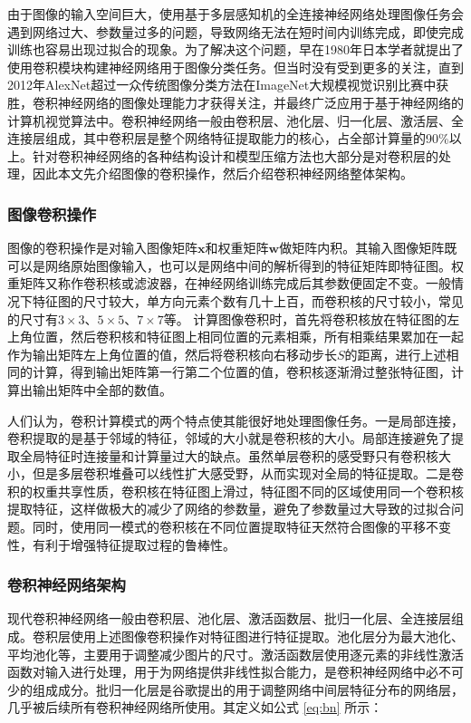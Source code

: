 由于图像的输入空间巨大，使用基于多层感知机的全连接神经网络处理图像任务会遇到网络过大、参数量过多的问题，导致网络无法在短时间内训练完成，即使完成训练也容易出现过拟合的现象。为了解决这个问题，早在1980年日本学者就提出了使用卷积模块构建神经网络用于图像分类任务\cite{fukushima1982neocognitron}。但当时没有受到更多的关注，直到2012年AlexNet\cite{alexnet}超过一众传统图像分类方法在ImageNet大规模视觉识别比赛中获胜，卷积神经网络的图像处理能力才获得关注，并最终广泛应用于基于神经网络的计算机视觉算法中。卷积神经网络一般由卷积层、池化层、归一化层、激活层、全连接层组成，其中卷积层是整个网络特征提取能力的核心，占全部计算量的90\%以上。针对卷积神经网络的各种结构设计和模型压缩方法也大部分是对卷积层的处理，因此本文先介绍图像的卷积操作，然后介绍卷积神经网络整体架构。

\subsubsection{图像卷积操作}

图像的卷积操作是对输入图像矩阵$\bm{x}$和权重矩阵$\bm{w}$做矩阵内积。其输入图像矩阵既可以是网络原始图像输入，也可以是网络中间的解析得到的特征矩阵即特征图。权重矩阵又称作卷积核或滤波器，在神经网络训练完成后其参数便固定不变。一般情况下特征图的尺寸较大，单方向元素个数有几十上百，而卷积核的尺寸较小，常见的尺寸有$3 \times 3$、$5 \times 5$、$7 \times 7$等。
计算图像卷积时，首先将卷积核放在特征图的左上角位置，然后卷积核和特征图上相同位置的元素相乘，所有相乘结果累加在一起作为输出矩阵左上角位置的值，然后将卷积核向右移动步长$S$的距离，进行上述相同的计算，得到输出矩阵第一行第二个位置的值，卷积核逐渐滑过整张特征图，计算出输出矩阵中全部的数值。

人们认为，卷积计算模式的两个特点使其能很好地处理图像任务。一是局部连接，卷积提取的是基于邻域的特征，邻域的大小就是卷积核的大小。局部连接避免了提取全局特征时连接量和计算量过大的缺点。虽然单层卷积的感受野只有卷积核大小，但是多层卷积堆叠可以线性扩大感受野，从而实现对全局的特征提取。二是卷积的权重共享性质，卷积核在特征图上滑过，特征图不同的区域使用同一个卷积核提取特征，这样做极大的减少了网络的参数量，避免了参数量过大导致的过拟合问题。同时，使用同一模式的卷积核在不同位置提取特征天然符合图像的平移不变性，有利于增强特征提取过程的鲁棒性。

\subsubsection{卷积神经网络架构}

现代卷积神经网络一般由卷积层、池化层、激活函数层、批归一化层、全连接层组成。卷积层使用上述图像卷积操作对特征图进行特征提取。池化层分为最大池化、平均池化等，主要用于调整减少图片的尺寸。激活函数层使用逐元素的非线性激活函数对输入进行处理，用于为网络提供非线性拟合能力，是卷积神经网络中必不可少的组成成分。批归一化层\cite{bn}是谷歌提出的用于调整网络中间层特征分布的网络层，几乎被后续所有卷积神经网络所使用。其定义如公式 \eqref{eq:bn} 所示：

